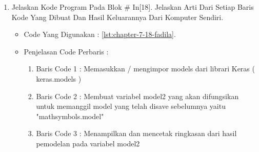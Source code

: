 \begin{enumerate}
\begin{itemize}
\item Code Yang Digunakan : \ref{lst:chapter-7-17-fadila}.

\par
\par
\item Penjelasan Code Perbaris	: 
\begin{enumerate}
\item Baris Code 1	: Melakukan penyimpanan terhadap label enkoder (untuk membalikkan one-hot encoder) dengan nama classes.npy
\end{enumerate}
\par
\par
\item Hasil : \ref{chapter-7-in-17-fadila}
\par
\par
\begin{figure}[!hbtp]
\centering
\texttt{[image: figures/chapter-7-in-17-fadila.jpg]}
\caption{Code Program Pada In [17] - fadila}
\label{chapter-7-in-17-fadila}
\end{figure}
\par
\par
\end{itemize}
\par
\par
\par
\item Jelaskan Kode Program Pada Blok \# In[18]. Jelaskan Arti Dari Setiap Baris Kode Yang Dibuat Dan Hasil Keluarannya Dari Komputer Sendiri.
\begin{itemize}
\item Code Yang Digunakan : \ref{lst:chapter-7-18-fadila}.

\par
\par
\item Penjelasan Code Perbaris	: 
\begin{enumerate}
\item Baris Code 1	: Memasukkan / mengimpor models dari librari Keras ( keras.models )
\item Baris Code 2	: Membuat variabel model2 yang akan difungsikan untuk memanggil model yang telah disave sebelumnya yaitu "mathsymbols.model"
\item Baris Code 3	: Menampilkan dan mencetak ringkasan dari hasil pemodelan pada variabel model2

\end{enumerate}
\end{itemize}
\end{enumerate}
